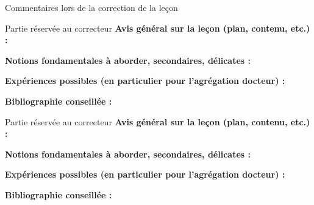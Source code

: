\begin{reportBlock}{Commentaires lors de la correction de la leçon}
\end{reportBlock}


\begin{reportBlock}{Partie réservée au correcteur}
  \textbf{Avis général sur la leçon (plan, contenu, etc.) :}
  
  
  \textbf{Notions fondamentales à aborder, secondaires, délicates :}
  
  
  \textbf{Expériences possibles (en particulier pour l'agrégation docteur) :}
  
  
  \textbf{Bibliographie conseillée :}
\end{reportBlock}


\begin{reportBlock}{Partie réservée au correcteur}
  \textbf{Avis général sur la leçon (plan, contenu, etc.) :}
  
  
  \textbf{Notions fondamentales à aborder, secondaires, délicates :}
  
  
  \textbf{Expériences possibles (en particulier pour l'agrégation docteur) :}
  
  
  \textbf{Bibliographie conseillée :}
\end{reportBlock}